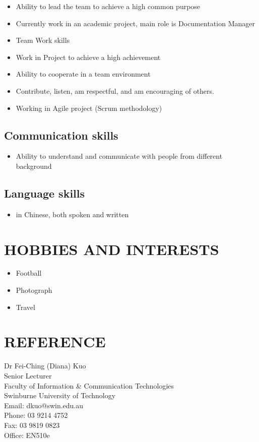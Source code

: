 \documentclass{article}
\begin{document}
	\begin{itemize}
		\item Ability to lead the team to achieve a high common purpose
		\item Currently work in an academic project, main role is Documentation Manager
		\item Team Work skills
		\item Work in Project to achieve a high achievement
		\item Ability to cooperate in a team environment
		\item Contribute, listen, am respectful, and am encouraging of others.
		\item Working in Agile project (Scrum methodology)
	\end{itemize}
	
\subsection*{Communication skills}
	
	\begin{itemize}
	\item Ability to understand and communicate with people from different background
	\end{itemize}
	
\subsection*{Language skills}

	\begin{itemize}
		\item in Chinese, both spoken and written
	\end{itemize}
	
\section*{HOBBIES AND INTERESTS}

	\begin{itemize}
		\item Football
		\item Photograph
		\item Travel
	\end{itemize}
	
\section*{REFERENCE}
	Dr Fei-Ching (Diana) Kuo \\
	Senior Lecturer \\
	Faculty of Information \& Communication Technologies \\
	Swinburne University of Technology \\
	Email: dkuo@swin.edu.au \\
	Phone: 03 9214 4752 \\
	Fax: 03 9819 0823 \\
	Office: EN510e \\
	
\end{document}
